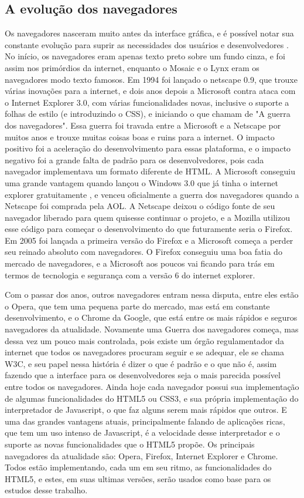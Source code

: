 \subsection{A evolução dos navegadores}

Os navegadores nasceram muito antes da interface gráfica,
e é possível notar sua constante evolução para suprir as necessidades
dos usuários e desenvolvedores \cite{robbins2006web}. No início, os
navegadores eram apenas texto preto sobre um fundo cinza, e foi assim
nos primórdios da internet, enquanto o Mosaic e o Lynx eram os
navegadores modo texto famosos. Em 1994 foi lançado o netscape 0.9, que
trouxe várias inovações para a internet, e dois anos depois a
Microsoft contra ataca com o Internet Explorer 3.0, com várias
funcionalidades novas, inclusive o suporte a folhas de estilo (e
introduzindo o CSS), e iniciando o que chamam de "A guerra dos
navegadores". Essa guerra foi travada entre a Microsoft e a Netscape
por muitos anos e trouxe muitas coisas boas e ruins para a internet. O
impacto positivo foi a aceleração do desenvolvimento para essas
plataforma, e o impacto negativo foi a grande falta de padrão para os
desenvolvedores, pois cada navegador implementava um formato diferente
de HTML. A Microsoft conseguiu uma grande vantagem quando lançou
o Windows 3.0 que já tinha o internet explorer gratuitamente
\cite{asleson2006foundations}, e venceu oficialmente a guerra dos navegadores quando a
Netscape foi comprada pela AOL. A Netscape deixou o código fonte
de seu navegador liberado para quem quisesse continuar o projeto,
e a Mozilla utilizou esse código para começar o desenvolvimento
do que futuramente seria o Firefox.
Em 2005 foi lançada a primeira versão do Firefox e a Microsoft começa
a perder seu reinado absoluto com navegadores. O Firefox conseguiu uma
boa fatia do mercado de navegadores, e a Microsoft aos poucos vai
ficando para trás em termos de tecnologia e segurança com a versão 6
do internet explorer.

Com o passar dos anos, outros navegadores entram nessa disputa, entre
eles estão o Opera, que tem uma pequena parte do mercado, mas está em
constante desenvolvimento, e o Chrome da Google, que está entre os
mais rápidos e seguros navegadores da atualidade.
Novamente uma Guerra dos navegadores começa, mas dessa vez um pouco
mais controlada, pois existe um órgão regulamentador da internet que
todos os navegadores procuram seguir e se adequar, ele se chama W3C,
e seu papel nessa história é dizer o que
é padrão e o que não é, assim fazendo que a interface para os
desenvolvedores seja o mais parecida possível entre todos os
navegadores.
Ainda hoje cada navegador possui sua implementação de algumas
funcionalidades do HTML5 ou CSS3, e sua própria implementação do
interpretador de Javascript, o que faz alguns serem mais rápidos que
outros. E uma das grandes vantagens atuais, principalmente falando de
aplicações ricas, que tem um uso intenso de Javascript, é a velocidade
desse interpretador e o suporte as novas funcionalidades que o HTML5
propõe.
Os principais navegadores da atualidade são: Opera, Firefox, Internet
Explorer e Chrome. Todos estão implementando, cada um em seu ritmo, as
funcionalidades do HTML5, e estes, em suas ultimas versões, serão usados
como base para os estudos desse trabalho.

